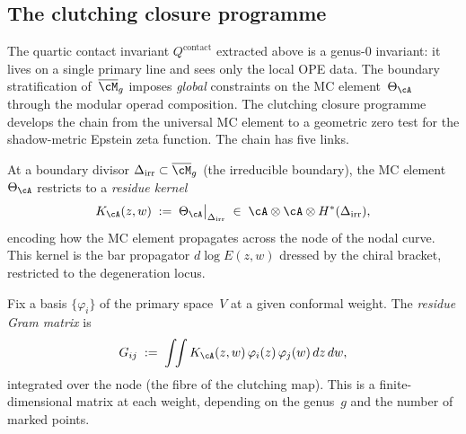 \subsection{The clutching closure programme}
\label{subsec:clutching-closure-programme}

The quartic contact invariant $Q^{\mathrm{contact}}$ extracted
above is a genus-$0$ invariant: it lives on a single primary
line and sees only the local OPE data.
The boundary stratification
of~$\overline{\cM}_g$ imposes \emph{global} constraints
on the MC element~$\Theta_\cA$ through the modular operad
composition.  The clutching closure programme develops
the chain from the universal MC element
to a geometric zero test for the shadow-metric Epstein
zeta function.  The chain has five links.

\begin{construction}%
\label{constr:residue-kernel-clutching}%
%
At a boundary divisor $\Delta_{\mathrm{irr}} \subset
\overline{\cM}_g$ (the irreducible boundary), the MC
element $\Theta_\cA$ restricts to a
\emph{residue kernel}
\[
K_\cA(z,w)
\;:=\;
\Theta_\cA\big|_{\Delta_{\mathrm{irr}}}
\;\in\;
\cA \otimes \cA \otimes
H^*(\Delta_{\mathrm{irr}}),
\]
encoding how the MC element propagates across the node of
the nodal curve.  This kernel is the bar propagator
$d\log E(z,w)$ dressed by the chiral bracket, restricted
to the degeneration locus.
\end{construction}

\begin{construction}%
\label{constr:residue-gram-clutching}%
%
Fix a basis $\{\varphi_i\}$ of the primary space~$V$ at
a given conformal weight.  The \emph{residue Gram matrix} is
\begin{equation}\label{eq:residue-gram-clutching}
G_{ij}
\;:=\;
\int\!\!\int K_\cA(z,w)\,
\varphi_i(z)\,\varphi_j(w)\,dz\,dw,
\end{equation}
integrated over the node (the fibre of the clutching map).
This is a finite-dimensional matrix at each weight,
depending on the genus~$g$ and the number of marked points.
\end{construction}

